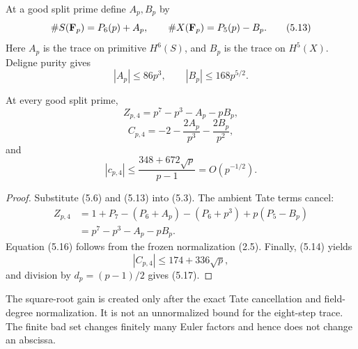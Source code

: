 At a good split prime define \(A_p,B_p\) by
\[
 \#S(\mathbf F_p)=P_6(p)+A_p,\qquad
 \#X(\mathbf F_p)=P_5(p)-B_p.                                  \tag{5.13}
\]
Here \(A_p\) is the trace on primitive \(H^6(S)\), and \(B_p\) is the trace
on \(H^5(X)\).  Deligne purity \cite[Th\'eor\`eme~1.6]{Deligne1974} gives
\[
 |A_p|\le86p^3,\qquad |B_p|\le168p^{5/2}.               \tag{5.14}
\]

\begin{proposition}\label{prop:fourth-formula}
At every good split prime,
\[
 Z_{p,4}=p^7-p^3-A_p-pB_p,                             \tag{5.15}
\]
\[
 C_{p,4}=-2-\frac{2A_p}{p^3}-\frac{2B_p}{p^2},         \tag{5.16}
\]
and
\[
 |c_{p,4}|\le
 \frac{348+672\sqrt p}{p-1}=O(p^{-1/2}).               \tag{5.17}
\]
\end{proposition}

\begin{proof}
Substitute (5.6) and (5.13) into (5.3).  The ambient Tate terms cancel:
\[
\begin{aligned}
 Z_{p,4}
 &=1+P_7-(P_6+A_p)-(P_6+p^3)+p(P_5-B_p)\\
 &=p^7-p^3-A_p-pB_p.
\end{aligned}
\]
Equation (5.16) follows from the frozen normalization (2.5).  Finally,
(5.14) yields
\[
 |C_{p,4}|\le174+336\sqrt p,
\]
and division by \(d_p=(p-1)/2\) gives (5.17).
\end{proof}

\begin{remark}
The square-root gain is created only after the exact Tate cancellation and
field-degree normalization.  It is not an unnormalized bound for the
eight-step trace.  The finite bad set changes finitely many Euler factors
and hence does not change an abscissa.
\end{remark}
